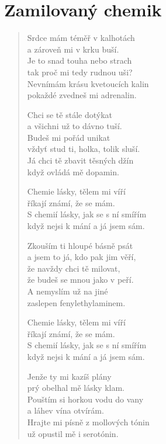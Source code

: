 \section*{Zamilovaný chemik}

\thispagestyle{empty}

\begin{multicols}{2}

\begin{verse}


Srdce mám téměř v kalhotách\\
a zároveň mi v krku buší.\\
Je to snad touha nebo strach\\
tak proč mi tedy rudnou uši?\\
Nevnímám krásu kvetoucích kalin\\
pokaždé zvedneš mi adrenalin.

Chci se tě stále dotýkat\\
a všichni už to dávno tuší.\\
Budeš mi pořád unikat\\
vždyť stud ti, holka, tolik sluší.\\
Já chci tě zbavit těsných džín\\
když ovládá mě dopamin.

Chemie lásky, tělem mi víří\\
říkají známí, že se mám.\\
S chemií lásky, jak se s ní smířím\\
když nejsi k mání a já jsem sám.

Zkouším ti hloupé básně psát\\
a jsem to já, kdo pak jim věří,\\
že navždy chci tě milovat,\\
že budeš se mnou jako v peří.\\
A nemyslím už na jiné\\
zaslepen fenylethylaminem.

Chemie lásky, tělem mi víří\\
říkají známí, že se mám.\\
S chemií lásky, jak se s ní smířím\\
když nejsi k mání a já jsem sám.

Jenže ty mi kazíš plány\\
prý obelhal mě lásky klam.\\
Pouštím si horkou vodu do vany\\
a láhev vína otvírám.\\
Hrajte mi písně z mollových tónin\\
už opustil mě i serotónin.


\end{verse}

\end{multicols}